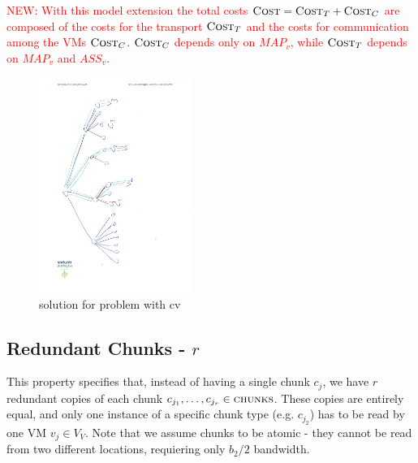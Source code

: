 \documentclass[9pt,twocolumn]{scrartcl}
\newcommand{\VM}{\textsc{VM}}
\newcommand{\Chunk}{\ensuremath{c}}
\newcommand{\carlo}[1]{\textcolor{red}{#1}}
\newcommand{\RedundancyFactor}{\ensuremath{r}}
\newcommand{\VmChunkAssignment}{\ensuremath{ASS_v}}
\newcommand{\NodeMapping}{\ensuremath{MAP_v}}
\newcommand{\VirtualNodes}{\ensuremath{V_V}}
\newcommand{\VirtualNode}{\ensuremath{v}}
\newcommand{\Chunks}{\ensuremath{\textsc{chunks}}}
\newcommand{\Cost}{\textsc{Cost}}
\newcommand{\CostTrans}{\ensuremath{b_2}}
\begin{document}
\carlo{NEW: With this model extension the total costs $\Cost = \Cost_T +
\Cost_C$ are composed of the costs for the transport $\Cost_T$ and the costs
for communication among the VMs $\Cost_C$. $\Cost_C$ depends only on
$\NodeMapping$, while $\Cost_T$ depends on $\NodeMapping$ and
$\VmChunkAssignment$.}

\begin{figure}

\includegraphics[angle=270,origin=c, height=7cm]{figs/model_fig_skteches/cv}
\caption{solution for problem with cv}
\end{figure}



\subsection{Redundant Chunks - $r$}

This property specifies that, instead of having a single chunk $\Chunk_j$, we
have $\RedundancyFactor$ redundant copies of each chunk
$\Chunk_{j_1},\dots,\Chunk_{j_\RedundancyFactor}  \in \Chunks$. These copies are
entirely equal, and only one instance of a specific chunk type (e.g.
$\Chunk_{j_2}$) has to be read by one VM $\VirtualNode_j \in \VirtualNodes$.
Note that we assume chunks to be atomic - they cannot be read from two different
locations, requiering only $\CostTrans / 2$  bandwidth.
\end{document}
